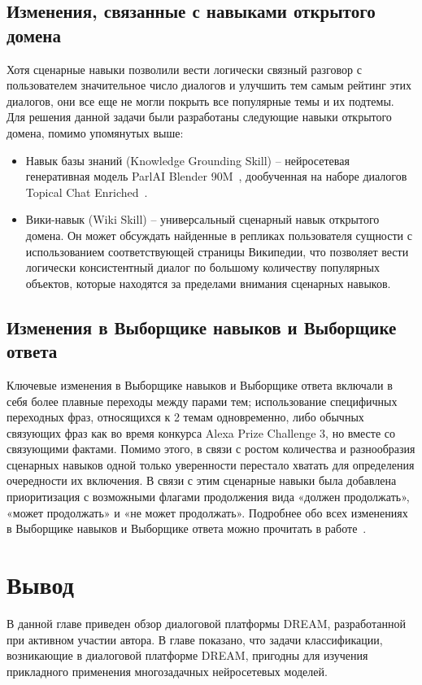 \subsection{Изменения, связанные с навыками открытого домена}

Хотя сценарные навыки позволили вести логически связный разговор с пользователем значительное число диалогов и улучшить тем самым рейтинг этих диалогов, они все еще не могли покрыть все популярные темы и их подтемы. Для решения данной задачи были разработаны следующие навыки открытого домена, помимо упомянутых выше:
\begin{itemize}
\item Навык базы знаний (Knowledge Grounding Skill) -- нейросетевая генеративная модель ParlAI Blender 90M~\cite{roller_other_2020}, дообученная на наборе диалогов Topical Chat Enriched~\cite{hedayatnia_2020}.
\item Вики-навык (Wiki Skill) -- универсальный сценарный навык открытого домена. Он может обсуждать найденные в репликах пользователя сущности с использованием соответствующей страницы Википедии, что позволяет вести логически консистентный диалог по большому количеству популярных объектов, которые находятся за пределами внимания сценарных навыков.
\end{itemize}
\subsection{Изменения в Выборщике навыков и Выборщике ответа}

Ключевые изменения в Выборщике навыков и Выборщике ответа включали в себя более плавные переходы между парами тем; использование специфичных переходных фраз, относящихся к 2 темам одновременно, либо обычных связующих фраз как во время конкурса Alexa Prize Challenge 3, но вместе со связующими фактами.
Помимо этого, в связи с ростом количества и разнообразия сценарных навыков одной только уверенности перестало хватать для определения очередности их включения. В связи с этим сценарные навыки была добавлена приоритизация с возможными флагами продолжения вида «должен продолжать», «может продолжать» и «не может продолжать».
Подробнее обо всех изменениях в Выборщике навыков и Выборщике ответа можно прочитать в работе~\cite{dream2}.

\section{Вывод}

В данной главе приведен обзор диалоговой платформы DREAM, разработанной при активном участии автора. В главе показано, что задачи классификации, возникающие в диалоговой платформе DREAM, пригодны для изучения прикладного применения многозадачных нейросетевых моделей.
